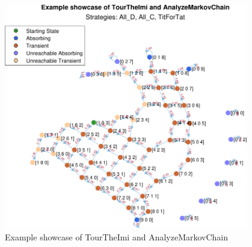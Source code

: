 \documentclass[12pt]{article}
\begin{document}
	\begin{figure}[h]
	      \centering
	      \includegraphics[width=0.95\textwidth]{Example showcase of TourTheImi and AnalyzeMarkovChain.pdf}
	      \caption{Example showcase of TourTheImi and AnalyzeMarkovChain}
	      \label{fig:TourTheImi153}
	\end{figure}
	
\end{document}
